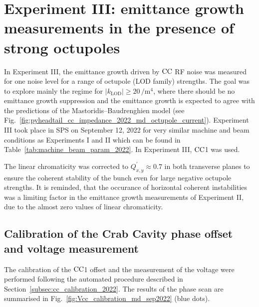 \section{Experiment III: emittance growth measurements in the presence of strong octupoles}\label{subsec:cc_md_sep_2022_octupole_scan}

In Experiment III, the emittance growth driven by ${\mathrm{CC}}$ RF noise was measured for one noise level for a range of octupole (LOD family) strengths. The goal was to explore mainly the regime for $|k_\mathrm{LOD}| \geq 20$\,$\mathrm{/m^4}$, where there should be no emittance growth suppression and the emittance growth is expected to agree with the predictions of the Mastoridis--Baudrenghien model %
(see Fig.~\ref{fig:pyheadtail_cc_impedance_2022_md_octupole_current}). Experiment III took place in SPS on September 12, 2022 for very similar machine and beam conditions as Experiments I and II which can be found in Table~\ref{tab:machine_beam_param_2022}. In Experiment III, ${\mathrm{CC}}$1 was used.

The linear chromaticity was corrected to $Q^\prime_{x,y} \approx 0.7$ in both transverse planes to ensure the coherent stability of the bunch even for large negative octupole strengths. It is reminded, that the occurance of horizontal coherent instabilities was a limiting factor in the emittance growth measurements of Experiment II, due to the almost zero values of linear chromaticity.


\subsection{Calibration of the Crab Cavity phase offset and voltage measurement}\label{subsec:cc_calibration_2022_exp3}
The calibration of the ${\mathrm{CC}}$1 offset and the measurement of the voltage were performed following the automated procedure described in Section~\ref{subsec:cc_calibration_2022}. The results of the phase scan are summarised in Fig.~\ref{fig:Vcc_calibration_md_sep2022} (blue dots).

